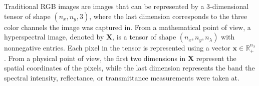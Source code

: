 Traditional RGB images are images that can be represented by a 3-dimensional tensor of shape $(n_x, n_y, 3)$, where the last dimension corresponds to the three color channels the image was captured in. From a mathematical point of view, a hyperspectral image, denoted by $\mathbf{X}$, is a tensor of shape $(n_x, n_y, n_\lambda)$ with nonnegative entries. Each pixel in the tensor is represented using a vector $\mathbf{x} \in \mathbb{R}_+^{n_\lambda}$. From a physical point of view, the first two dimensions in $\mathbf{X}$ represent the spatial coordinates  of the pixels, while the last dimension represents the band the spectral intensity, reflectance, or transmittance measurements were taken at.
